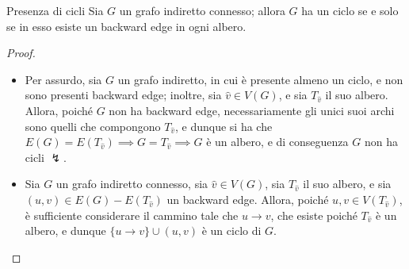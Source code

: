 \documentclass[a4paper, 12pt]{report}
\begin{document}
    \begin{framedthm}{Presenza di cicli}
        Sia $G$ un grafo indiretto connesso; allora $G$ ha un ciclo se e solo se in esso esiste un backward edge in ogni albero.
    \end{framedthm}

    \begin{proof}
        \hspace{0.7cm}
        \begin{itemize}
            \item[]  Per assurdo, sia $G$ un grafo indiretto, in cui è presente almeno un ciclo, e non sono presenti backward edge; inoltre, sia $\hat v \in V(G)$, e sia $T_{\hat v}$ il suo albero. Allora, poiché $G$ non ha backward edge, necessariamente gli unici suoi archi sono quelli che compongono $T_{\hat v}$, e dunque si ha che $E(G) = E(T_{\hat v}) \implies G = T_{\hat v} \implies G$ è un albero, e di conseguenza $G$ non ha cicli $\lightning$.
            \item[]  Sia $G$ un grafo indiretto connesso, sia $\hat v \in V(G)$, sia $T_{\hat v}$ il suo albero, e sia $(u, v) \in E(G) - E(T_{\hat v})$ un backward edge. Allora, poiché $u, v \in V(T_{\hat v})$, è sufficiente considerare il cammino tale che $u \rightarrow v$, che esiste poiché $T_{\hat v}$ è un albero, e dunque $\{u \rightarrow v\} \cup (u, v)$ è un ciclo di $G$.
        \end{itemize}
    \end{proof}
\end{document}
